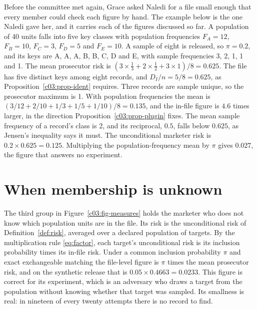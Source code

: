 \begin{example}\label{c3:ex-five}
Before the committee met again, Grace asked Naledi for a file small enough that every member could check each figure by hand. The example below is the one Naledi gave her, and it carries each of the figures discussed so far. A population of 40 units falls into five key classes with population frequencies $F_A=12$, $F_B=10$, $F_C=3$, $F_D=5$ and $F_E=10$. A sample of eight is released, so $\pi=0.2$, and its keys are A, A, A, B, B, C, D and E, with sample frequencies 3, 2, 1, 1 and 1. The mean prosecutor risk is $(3\times\frac13+2\times\frac12+3\times1)/8=0.625$. The file has five distinct keys among eight records, and $D_I/n=5/8=0.625$, as Proposition~\ref{c03:prop-ident} requires. Three records are sample unique, so the prosecutor maximum is 1. With population frequencies the mean is $(3/12+2/10+1/3+1/5+1/10)/8=0.135$, and the in-file figure is $4.6$ times larger, in the direction Proposition~\ref{c03:prop-plugin} fixes. The mean sample frequency of a record's class is 2, and its reciprocal, $0.5$, falls below $0.625$, as Jensen's inequality says it must. The unconditional marketer risk is $0.2\times0.625=0.125$. Multiplying the population-frequency mean by $\pi$ gives $0.027$, the figure that answers no experiment.
\end{example}

\section{When membership is unknown}

The third group in Figure~\ref{c03:fig-measures} holds the marketer who does not know
which population units are in the file. Its risk is the unconditional risk of
Definition~\ref{def:risk}, averaged over a declared population of targets. By the
multiplication rule \eqref{eq:factor}, each target's unconditional risk is its inclusion
probability times its in-file risk. Under a common inclusion probability $\pi$ and exact
exchangeable matching the file-level figure is $\pi$ times the mean prosecutor risk, and
on the synthetic release that is $0.05 \times 0.4663 = 0.0233$.
This figure is correct for its experiment, which is an adversary who draws a target from
the population without knowing whether that target was sampled. Its smallness is real:
in nineteen of every twenty attempts there is no record to find.

